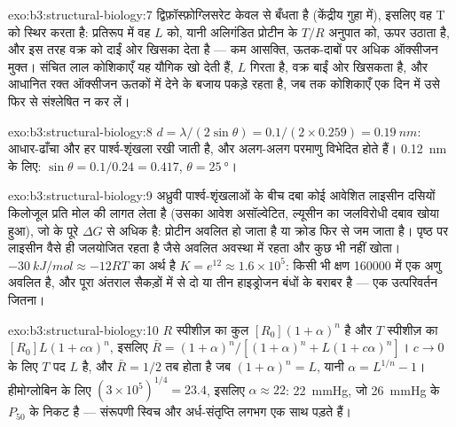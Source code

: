 \begin{solution}{exo:b3:structural-biology:7}
द्विफ़ॉस्फ़ोग्लिसरेट केवल  से बँधता है (केंद्रीय गुहा में),
इसलिए वह T को स्थिर करता है: प्रतिरूप में वह $L$ को, यानी अलिगंडित
प्रोटीन के $T/R$ अनुपात को, ऊपर उठाता है, और इस तरह वक्र को दाईं ओर
खिसका देता है --- कम आसक्ति, ऊतक-दाबों पर अधिक ऑक्सीजन मुक्त। संचित
लाल कोशिकाएँ यह यौगिक खो देती हैं, $L$ गिरता है, वक्र बाईं ओर खिसकता
है, और आधानित रक्त ऑक्सीजन ऊतकों में देने के बजाय पकड़े रहता है, जब तक
कोशिकाएँ एक दिन में उसे फिर से संश्लेषित न कर लें।
\end{solution}

\begin{solution}{exo:b3:structural-biology:8}
$d = \lambda/(2\sin\theta) = 0.1/(2\times 0.259) = \qty{0.19}{nm}$:
आधार-ढाँचा और हर पार्श्व-शृंखला रखी जाती है, और अलग-अलग परमाणु विभेदित
होते हैं। \qty{0.12}{nm} के लिए: $\sin\theta = 0.1/0.24 = 0.417$, $\theta =
\qty{25}{\degree}$।
\end{solution}

\begin{solution}{exo:b3:structural-biology:9}
अध्रुवी पार्श्व-शृंखलाओं के बीच दबा कोई आवेशित लाइसीन दसियों किलोजूल
प्रति मोल की लागत लेता है (उसका आवेश असॉल्वेटित, ल्यूसीन का जलविरोधी
दबाव खोया हुआ), जो  के पूरे $\Delta G$ से अधिक है: प्रोटीन अवलित हो
जाता है या क्रोड फिर से जम जाता है। पृष्ठ पर लाइसीन वैसे ही जलयोजित
रहता है जैसे अवलित अवस्था में रहता और कुछ भी नहीं खोता।
$\qty{-30}{kJ/mol} \approx -12RT$ का अर्थ है $K = e^{12} \approx 1.6\times
10^{5}$: किसी भी क्षण \num{160000} में एक अणु अवलित है, और पूरा
अंतराल सैकड़ों में से दो या तीन हाइड्रोजन बंधों के बराबर है --- एक
उत्परिवर्तन जितना।
\end{solution}

\begin{solution}{exo:b3:structural-biology:10}
$R$ स्पीशीज़ का कुल $[R_{0}](1+\alpha)^{n}$ है और $T$ स्पीशीज़ का
$[R_{0}]L(1+c\alpha)^{n}$, इसलिए $\bar R = (1+\alpha)^{n}/[(1+\alpha)^{n}
+ L(1+c\alpha)^{n}]$। $c \to 0$ के लिए $T$ पद $L$ है, और $\bar R =
1/2$ तब होता है जब $(1+\alpha)^{n} = L$, यानी $\alpha = L^{1/n} - 1$।
हीमोग्लोबिन के लिए $(3\times 10^{5})^{1/4} = 23.4$, इसलिए $\alpha \approx 22$:
\qty{22}{mmHg}, जो \qty{26}{mmHg} के $P_{50}$ के निकट है ---
संरूपणी स्विच और अर्ध-संतृप्ति लगभग एक साथ पड़ते हैं।
\end{solution}

